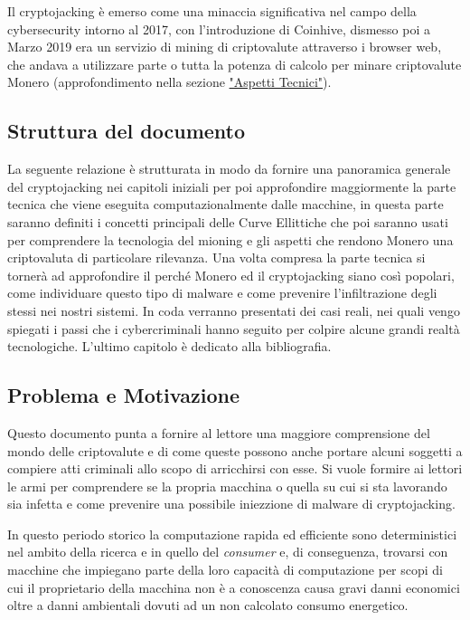 \documentclass[12pt,a4paper]{article}
\begin{document}
Il cryptojacking è emerso come una minaccia significativa nel campo della
cybersecurity intorno al 2017, con l'introduzione di Coinhive, dismesso poi a
Marzo 2019 era un servizio di mining di criptovalute attraverso i browser web,
che andava a utilizzare parte o tutta la potenza di calcolo per minare
criptovalute Monero (approfondimento nella sezione
\hyperref[sec:aspetti_tecnici]{"Aspetti Tecnici"}). 

\subsection{Struttura del documento}
La seguente relazione è strutturata in modo da fornire una panoramica generale
del cryptojacking nei capitoli iniziali per poi approfondire maggiormente la
parte tecnica che viene eseguita computazionalmente dalle macchine, in questa
parte saranno definiti i concetti principali delle Curve Ellittiche che poi
saranno usati per comprendere la tecnologia del mioning e gli aspetti che
rendono Monero una criptovaluta di particolare rilevanza. Una volta compresa la
parte tecnica si tornerà ad approfondire il perché Monero ed il cryptojacking
siano così popolari, come individuare questo tipo di malware e come prevenire
l'infiltrazione degli stessi nei nostri sistemi. In coda verranno presentati dei
casi reali, nei quali vengo spiegati i passi che i cybercriminali hanno seguito
per colpire alcune grandi realtà tecnologiche. L'ultimo capitolo è dedicato alla
bibliografia.

\subsection{Problema e Motivazione}
Questo documento punta a fornire al lettore una maggiore comprensione del mondo
delle criptovalute e di come queste possono anche portare alcuni soggetti a
compiere atti criminali allo scopo di arricchirsi con esse. Si vuole formire ai
lettori le armi per comprendere se la propria macchina o quella su cui si sta
lavorando sia infetta e come prevenire una possibile iniezzione di malware di
cryptojacking.

In questo periodo storico la computazione rapida ed efficiente sono
deterministici nel ambito della ricerca e in quello del \textit{consumer} e, di
conseguenza, trovarsi con macchine che impiegano parte della loro capacità di
computazione per scopi di cui il proprietario della macchina non è a conoscenza
causa gravi danni economici oltre a danni ambientali dovuti ad un non calcolato
consumo energetico.
\end{document}
